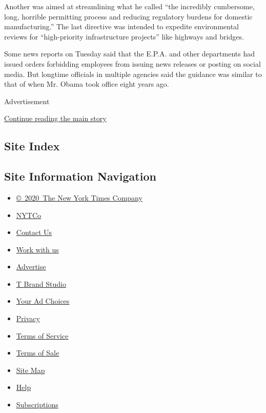 Another was aimed at streamlining what he called ``the incredibly
cumbersome, long, horrible permitting process and reducing regulatory
burdens for domestic manufacturing.'' The last directive was intended to
expedite environmental reviews for ``high-priority infrastructure
projects'' like highways and bridges.

Some news reports on Tuesday said that the E.P.A. and other departments
had issued orders forbidding employees from issuing news releases or
posting on social media. But longtime officials in multiple agencies
said the guidance was similar to that of when Mr. Obama took office
eight years ago.

Advertisement

\protect\hyperlink{after-bottom}{Continue reading the main story}

\hypertarget{site-index}{%
\subsection{Site Index}\label{site-index}}

\hypertarget{site-information-navigation}{%
\subsection{Site Information
Navigation}\label{site-information-navigation}}

\begin{itemize}
\tightlist
\item
  \href{https://help.nytimes.com/hc/en-us/articles/115014792127-Copyright-notice}{©~2020~The
  New York Times Company}
\end{itemize}

\begin{itemize}
\tightlist
\item
  \href{https://www.nytco.com/}{NYTCo}
\item
  \href{https://help.nytimes.com/hc/en-us/articles/115015385887-Contact-Us}{Contact
  Us}
\item
  \href{https://www.nytco.com/careers/}{Work with us}
\item
  \href{https://nytmediakit.com/}{Advertise}
\item
  \href{http://www.tbrandstudio.com/}{T Brand Studio}
\item
  \href{https://www.nytimes.com/privacy/cookie-policy\#how-do-i-manage-trackers}{Your
  Ad Choices}
\item
  \href{https://www.nytimes.com/privacy}{Privacy}
\item
  \href{https://help.nytimes.com/hc/en-us/articles/115014893428-Terms-of-service}{Terms
  of Service}
\item
  \href{https://help.nytimes.com/hc/en-us/articles/115014893968-Terms-of-sale}{Terms
  of Sale}
\item
  \href{https://spiderbites.nytimes.com}{Site Map}
\item
  \href{https://help.nytimes.com/hc/en-us}{Help}
\item
  \href{https://www.nytimes.com/subscription?campaignId=37WXW}{Subscriptions}
\end{itemize}
